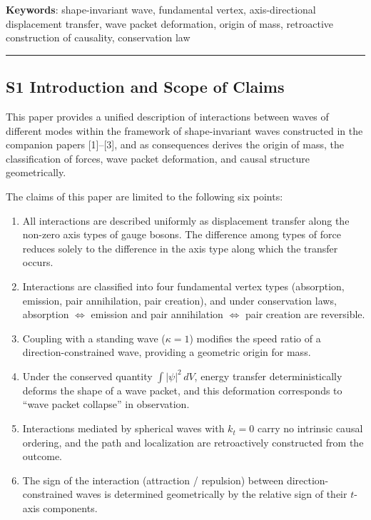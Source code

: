 \documentclass[
  a4paper,11pt]{article}
\providecommand{\tightlist}{%
  \setlength{\itemsep}{0pt}\setlength{\parskip}{0pt}}
\theoremstyle{definition}
\theoremstyle{remark}
\begin{document}
\textbf{Keywords}: shape-invariant wave, fundamental vertex,
axis-directional displacement transfer, wave packet deformation, origin
of mass, retroactive construction of causality, conservation law

\begin{center}\rule{0.5\linewidth}{0.5pt}\end{center}

\subsection{S1 Introduction and Scope of
Claims}\label{s1-introduction-and-scope-of-claims}

This paper provides a unified description of interactions between waves
of different modes within the framework of shape-invariant waves
constructed in the companion papers {[}1{]}--{[}3{]}, and as
consequences derives the origin of mass, the classification of forces,
wave packet deformation, and causal structure geometrically.

The claims of this paper are limited to the following six points:

\begin{enumerate}
\def\labelenumi{\arabic{enumi}.}
\tightlist
\item
  All interactions are described uniformly as displacement transfer
  along the non-zero axis types of gauge bosons. The difference among
  types of force reduces solely to the difference in the axis type along
  which the transfer occurs.
\item
  Interactions are classified into four fundamental vertex types
  (absorption, emission, pair annihilation, pair creation), and under
  conservation laws, absorption \(\Leftrightarrow\) emission and pair
  annihilation \(\Leftrightarrow\) pair creation are reversible.
\item
  Coupling with a standing wave (\(\kappa = 1\)) modifies the speed
  ratio of a direction-constrained wave, providing a geometric origin
  for mass.
\item
  Under the conserved quantity \(\int |\psi|^2 \, dV\), energy transfer
  deterministically deforms the shape of a wave packet, and this
  deformation corresponds to ``wave packet collapse'' in observation.
\item
  Interactions mediated by spherical waves with \(k_t = 0\) carry no
  intrinsic causal ordering, and the path and localization are
  retroactively constructed from the outcome.
\item
  The sign of the interaction (attraction / repulsion) between
  direction-constrained waves is determined geometrically by the
  relative sign of their \(t\)-axis components.
\end{enumerate}
\end{document}
